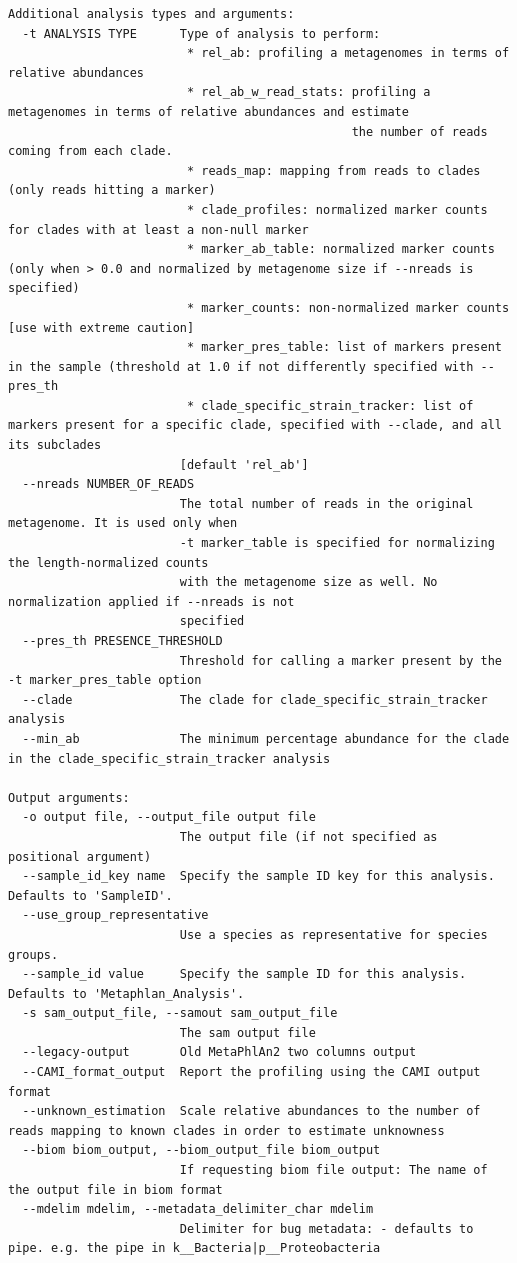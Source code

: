 \documentclass[
  letterpaper,
]{book}
\begin{document}
\begin{verbatim}
Additional analysis types and arguments:
  -t ANALYSIS TYPE      Type of analysis to perform:
                         * rel_ab: profiling a metagenomes in terms of relative abundances
                         * rel_ab_w_read_stats: profiling a metagenomes in terms of relative abundances and estimate
                                                the number of reads coming from each clade.
                         * reads_map: mapping from reads to clades (only reads hitting a marker)
                         * clade_profiles: normalized marker counts for clades with at least a non-null marker
                         * marker_ab_table: normalized marker counts (only when > 0.0 and normalized by metagenome size if --nreads is specified)
                         * marker_counts: non-normalized marker counts [use with extreme caution]
                         * marker_pres_table: list of markers present in the sample (threshold at 1.0 if not differently specified with --pres_th
                         * clade_specific_strain_tracker: list of markers present for a specific clade, specified with --clade, and all its subclades
                        [default 'rel_ab']
  --nreads NUMBER_OF_READS
                        The total number of reads in the original metagenome. It is used only when
                        -t marker_table is specified for normalizing the length-normalized counts
                        with the metagenome size as well. No normalization applied if --nreads is not
                        specified
  --pres_th PRESENCE_THRESHOLD
                        Threshold for calling a marker present by the -t marker_pres_table option
  --clade               The clade for clade_specific_strain_tracker analysis
  --min_ab              The minimum percentage abundance for the clade in the clade_specific_strain_tracker analysis

Output arguments:
  -o output file, --output_file output file
                        The output file (if not specified as positional argument)
  --sample_id_key name  Specify the sample ID key for this analysis. Defaults to 'SampleID'.
  --use_group_representative
                        Use a species as representative for species groups.
  --sample_id value     Specify the sample ID for this analysis. Defaults to 'Metaphlan_Analysis'.
  -s sam_output_file, --samout sam_output_file
                        The sam output file
  --legacy-output       Old MetaPhlAn2 two columns output
  --CAMI_format_output  Report the profiling using the CAMI output format
  --unknown_estimation  Scale relative abundances to the number of reads mapping to known clades in order to estimate unknowness
  --biom biom_output, --biom_output_file biom_output
                        If requesting biom file output: The name of the output file in biom format
  --mdelim mdelim, --metadata_delimiter_char mdelim
                        Delimiter for bug metadata: - defaults to pipe. e.g. the pipe in k__Bacteria|p__Proteobacteria


\end{verbatim}
\end{document}
